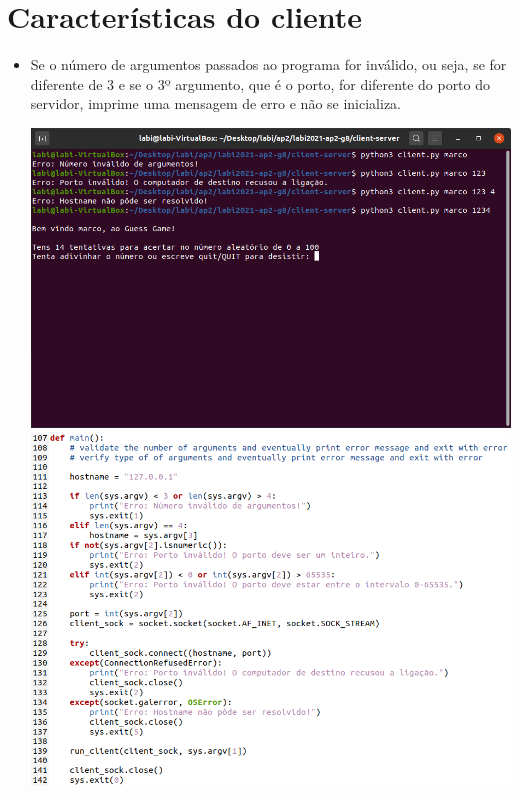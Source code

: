 \documentclass{report}
\begin{document}
\section{Características do cliente}
\begin{itemize}
    \item Se o número de argumentos passados ao programa for inválido, ou seja, se for diferente de 3 e se o 3º argumento, que é o porto, for diferente do porto do servidor, imprime uma mensagem de erro e não se inicializa.
        \begin{center}
            \includegraphics[scale = 0.55]{Imagens/cliente4.png}
            \includegraphics[scale = 0.59]{Imagens/cliente5.png}
        \end{center}
    

\end{itemize}
\end{document}
